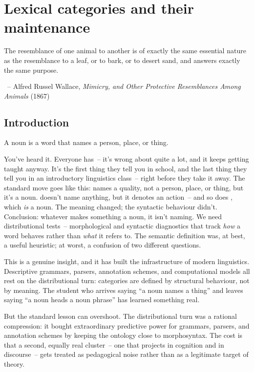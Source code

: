 \chapter{Lexical categories and their maintenance}
\label{ch:lexical-categories}

\epigraph{The resemblance of one animal to another is of exactly the same essential nature as the resemblance to a leaf, or to bark, or to desert sand, and answers exactly the same purpose.}{~-- Alfred Russel Wallace, \textit{Mimicry, and Other Protective Resemblances Among Animals} (1867)}

\section{Introduction}
\label{sec:11:intro}

A noun is a word that names a person, place, or thing.

You've heard it. Everyone has~-- it's wrong about quite a lot, and it keeps getting taught anyway. It's the first thing they tell you in school, and the last thing they tell you in an introductory linguistics class~-- right before they take it away. The standard move goes like this:  names a quality, not a person, place, or thing, but it's a noun.  doesn't name anything, but it denotes an action~-- and so does , which \emph{is} a noun. The meaning changed; the syntactic behaviour didn't. Conclusion: whatever makes something a noun, it isn't naming. We need distributional tests~-- morphological and syntactic diagnostics that track \emph{how} a word behaves rather than \emph{what} it refers to. The semantic definition was, at best, a useful heuristic; at worst, a confusion of two different questions.

This is a genuine insight, and it has built the infrastructure of modern linguistics. Descriptive grammars, parsers, annotation schemes, and computational models all rest on the distributional turn: categories are defined by structural behaviour, not by meaning. The student who arrives saying \enquote{a noun names a thing} and leaves saying \enquote{a noun heads a noun phrase} has learned something real.

But the standard lesson can overshoot. The distributional turn was a rational compression: it bought extraordinary predictive power for grammars, parsers, and annotation schemes by keeping the ontology close to morphosyntax. The cost is that a second, equally real cluster~-- one that projects in cognition and in discourse~-- gets treated as pedagogical noise rather than as a legitimate target of theory.

